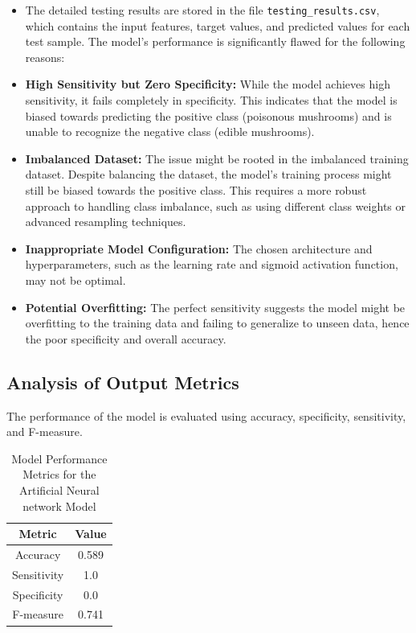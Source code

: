 \documentclass{article}
\begin{document}
\begin{itemize}
    \item The detailed testing results are stored in the file \texttt{testing\_results.csv}, which contains the input features, target values, and predicted values for each test sample.
    The model's performance is significantly flawed for the following reasons:
    \item \textbf{High Sensitivity but Zero Specificity:} While the model achieves high sensitivity, it fails completely in specificity. This indicates that the model is biased towards predicting the positive class (poisonous mushrooms) and is unable to recognize the negative class (edible mushrooms).
    \item \textbf{Imbalanced Dataset:} The issue might be rooted in the imbalanced training dataset. Despite balancing the dataset, the model's training process might still be biased towards the positive class. This requires a more robust approach to handling class imbalance, such as using different class weights or advanced resampling techniques.
    \item \textbf{Inappropriate Model Configuration:} The chosen architecture and hyperparameters, such as the learning rate and sigmoid activation function, may not be optimal. 
    \item \textbf{Potential Overfitting:} The perfect sensitivity suggests the model might be overfitting to the training data and failing to generalize to unseen data, hence the poor specificity and overall accuracy.
\end{itemize}

\subsection{Analysis of Output Metrics}
The performance of the model is evaluated using accuracy, specificity, sensitivity, and F-measure.

\begin{table}[h!]
\centering
\begin{tabular}{|c|c|}
\hline
\textbf{Metric} & \textbf{Value} \\ \hline
Accuracy        & 0.589          \\ 
Sensitivity     & 1.0            \\ 
Specificity     & 0.0            \\ 
F-measure       & 0.741          \\ \hline
\end{tabular}
\caption{Model Performance Metrics for the Artificial Neural network Model}
\end{table}
\end{document}

